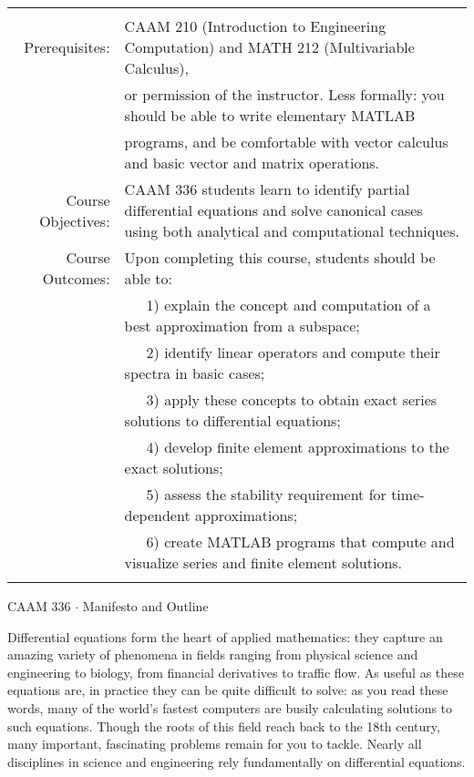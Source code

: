\documentclass[10pt]{article}
\begin{document}
\vspace{-1em}
\hspace*{-3em}
\begin{tabular}{rp{42em}}
\hline & \\[-.5em]
Prerequisites:           & CAAM 210 (Introduction to Engineering Computation) and MATH 212 (Multivariable Calculus), \\
                         & or permission of the instructor.   Less formally: you should be able to write elementary MATLAB\\
                         & programs, and be comfortable with vector calculus and basic vector and matrix operations.\\[1.25em]

Course Objectives:       & CAAM 336 students learn to identify partial differential equations
                                and solve canonical cases using both analytical and computational techniques.\\[1em]
%
Course Outcomes:         & Upon completing this course, students should be able to:\\
                         & \ \ \ 1) explain the concept and computation of a best approximation from a subspace;\\
                         & \ \ \ 2) identify linear operators and compute their spectra in basic cases;\\
                         & \ \ \ 3) apply these concepts to obtain exact series solutions to differential equations;\\
                         & \ \ \ 4) develop finite element approximations to the exact solutions;\\
                         & \ \ \ 5) assess the stability requirement for time-dependent approximations;\\
                         & \ \ \ 6) create MATLAB programs that compute and visualize series and finite element solutions. \\[1em] 
%
\hline & \\[-.5em]
\end{tabular}

\vspace*{-1em}
\begin{center} 
   CAAM 336 $\cdot$ Manifesto and Outline
\end{center}

\vspace*{-1em}

Differential equations form the heart of applied mathematics:
they capture an amazing variety of phenomena in fields ranging from 
physical science and engineering to biology, from financial derivatives
to traffic flow.
As useful as these equations are, in practice they can be quite
difficult to solve:  as you read these words, many of the world's 
fastest computers are busily calculating solutions to such equations.
Though the roots of this field reach back to the 18th century,
many important, fascinating problems remain for you to tackle.
Nearly all disciplines in science and engineering rely 
fundamentally on differential equations.
\end{document}
